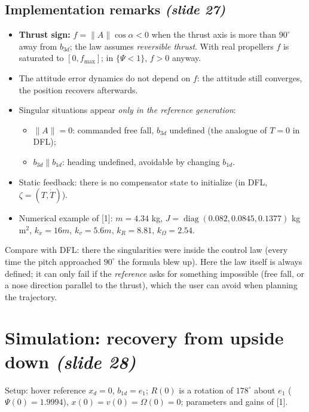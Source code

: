 \documentclass[11pt,a4paper]{article}
\newcommand{\diag}{\operatorname{diag}}
\newcommand{\sli}[1]{\emph{(#1)}}
\theoremstyle{definition}
\theoremstyle{plain}
\theoremstyle{remark}
\begin{document}
\subsection{Implementation remarks \sli{slide 27}}

\begin{itemize}
  \item \textbf{Thrust sign:} $f=\|A\|\cos\alpha<0$ when the thrust axis is more than $90^\circ$ away from $b_{3d}$; the law assumes \emph{reversible thrust}. With real propellers $f$ is saturated to $[0,f_{\max}]$; in $\{\Psi<1\}$, $f>0$ anyway.
  \item The attitude error dynamics do not depend on $f$: the attitude still converges, the position recovers afterwards.
  \item Singular situations appear \emph{only in the reference generation}:
  \begin{itemize}
    \item $\|A\|=0$: commanded free fall, $b_{3d}$ undefined (the analogue of $T=0$ in DFL);
    \item $b_{3d}\parallel b_{1d}$: heading undefined, avoidable by changing $b_{1d}$.
  \end{itemize}
  \item Static feedback: there is no compensator state to initialize (in DFL, $\zeta=(T,\dot T)$).
  \item Numerical example of [1]: $m=4.34$ kg, $J=\diag(0.082,0.0845,0.1377)$ kg\,m$^2$, $k_x=16m$, $k_v=5.6m$, $k_R=8.81$, $k_\Omega=2.54$.
\end{itemize}

\begin{intuition}
Compare with DFL: there the singularities were inside the control law (every time the pitch approached $90^\circ$ the formula blew up). Here the law itself is always defined; it can only fail if the \emph{reference} asks for something impossible (free fall, or a nose direction parallel to the thrust), which the user can avoid when planning the trajectory.
\end{intuition}

\section{Simulation: recovery from upside down \sli{slide 28}}

Setup: hover reference $x_d=0$, $b_{1d}=e_1$; $R(0)$ is a rotation of $178^\circ$ about $e_1$ ($\Psi(0)=1.9994$), $x(0)=v(0)=\Omega(0)=0$; parameters and gains of [1].
\end{document}
